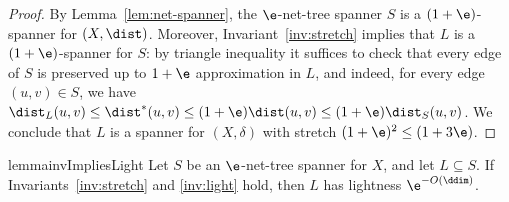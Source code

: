 \begin{proof}
    By Lemma~\ref{lem:net-spanner}, the $\e$-net-tree spanner $S$ is a $(1+\e)$-spanner for $(X, \dist)$. Moreover, Invariant~\ref{inv:stretch} implies that $L$ is a $(1+\e)$-spanner for $S$: by triangle inequality it suffices to check that every edge of $S$ is preserved up to $1+\e$ approximation in $L$, and indeed, for every edge $(u,v) \in S$, we have $\dist_L(u,v) \le \dist^*(u,v) \le (1+\e) \dist(u,v) \le (1+\e) \dist_S(u,v)$. We conclude that $L$ is a spanner for $(X,\delta)$ with stretch $(1+\e)^2 \le (1+3\e)$.
\end{proof}
%
%
%
% 
\begin{restatable}{lemma}{invImpliesLight}
\label{lem:inv-implies-light}
Let $S$ be an $\e$-net-tree spanner for $X$, and let $L \subseteq S$. If Invariants~\ref{inv:stretch} and \ref{inv:light} hold, then $L$ has lightness $\e^{-O(\ddim)}$.    
\end{restatable}
%
